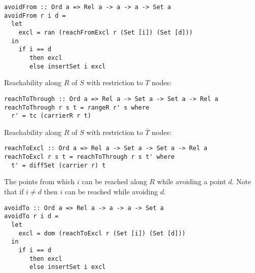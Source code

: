 \bc\begin{verbatim} 
avoidFrom :: Ord a => Rel a -> a -> a -> Set a
avoidFrom r i d = 
  let 
    excl = ran (reachFromExcl r (Set [i]) (Set [d]))
  in 
    if i == d 
       then excl 
       else insertSet i excl
\end{verbatim}\ec

Reachability along $R$ of $S$ with restriction to $T$ nodes: 

\bc\begin{verbatim}
reachToThrough :: Ord a => Rel a -> Set a -> Set a -> Rel a 
reachToThrough r s t = rangeR r' s where 
  r' = tc (carrierR r t) 
\end{verbatim}\ec

Reachability along $R$ of $S$ with restriction to $\overline{T}$ nodes: 

\bc\begin{verbatim}
reachToExcl :: Ord a => Rel a -> Set a -> Set a -> Rel a 
reachToExcl r s t = reachToThrough r s t' where 
  t' = diffSet (carrier r) t
\end{verbatim}\ec

The points from which $i$ can be reached along $R$ while avoiding a point $d$.
Note that if $i \neq d$ then $i$ can be reached while avoiding $d$. 

\bc\begin{verbatim}
avoidTo :: Ord a => Rel a -> a -> a -> Set a
avoidTo r i d = 
  let 
    excl = dom (reachToExcl r (Set [i]) (Set [d]))
  in 
    if i == d 
       then excl 
       else insertSet i excl
\end{verbatim}\ec





